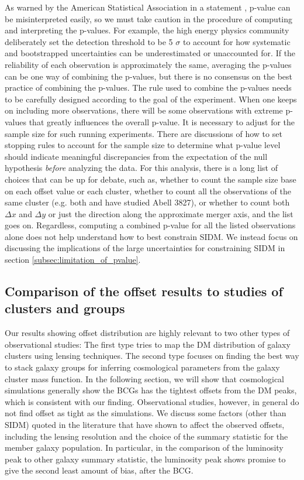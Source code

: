 As warned by the American Statistical Association in a statement \citep{Wasserstein2016},
p-value can be misinterpreted easily, so
we must take caution in the procedure of computing and interpreting the p-values. 
For example, the high energy physics community deliberately set the detection
threshold to be 5 $\sigma$ to account for how systematic and bootstrapped 
uncertainties can be
underestimated or unaccounted for. 
If the reliability of each observation is 
approximately the same, averaging the p-values can be one way of combining the p-values, 
but there is no consensus on the best practice of combining the
p-values. The rule used to combine the p-values 
needs to be carefully designed according to the goal of the experiment.
When one keeps on including more observations,  
there will be some observations with extreme p-values that greatly influences the
overall p-value. It is necessary to adjust for the sample size for such running
experiments.   
There are discussions of how to set stopping rules \citep{Demortier2007}
to account for the sample size to determine what p-value level should indicate meaningful
discrepancies from the expectation of the null hypothesis {\it before}
analyzing the data. 
For this analysis, there is a long list of choices that can be up for debate, 
such as, whether to count the sample 
size base on each offset value or each cluster, whether to count all the
observations of the same cluster (e.g. both \citealt{Williams2011a} and
\citealt{Massey2015} have studied Abell 3827), or whether to count both $\Delta x$
and $\Delta y$ or just the direction along the approximate merger axis, and the
list goes on.
Regardless, computing a combined p-value for all the listed observations alone 
does not help understand how to best constrain SIDM.
We instead focus on discussing the implications of the large uncertainties for
constraining SIDM in section \ref{subsec:limitation_of_pvalue}. 

\subsection{Comparison of the offset results to studies of clusters and groups}
Our results showing offset distribution are highly relevant to two other types of
observational studies: 
The first type tries to map the DM distribution of galaxy clusters 
using lensing techniques. 
The second type focuses on finding the best way to stack galaxy groups for
inferring cosmological parameters from the galaxy cluster mass function.
In the following section, we will show that cosmological simulations generally show 
the BCGs has the tightest offsets from the DM peaks, which is consistent with
our finding.
Observational studies, however, in general do not find offset as tight as the 
simulations. We discuss some factors (other than SIDM) quoted in the literature that 
have shown to affect the observed offsets, including the lensing resolution and the
choice of the summary statistic for the member galaxy population. In particular, 
in the comparison of the luminosity peak to other galaxy summary statistic,
the luminosity peak shows promise to give the second least amount of bias,
after the BCG. 
 

